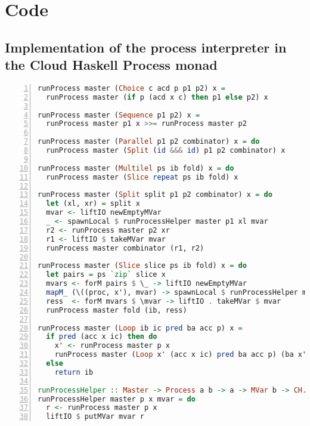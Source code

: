 \chapter{Code}

\clearpage

\section{Implementation of the process interpreter in the Cloud Haskell Process monad}
\label{app:distributed_split_slice}
\begin{lstlisting}[language=Haskell,frame=tb,numbers=left,caption=Implementation of \texttt{runProcess} in the \textsf{Cloud Haskell} \texttt{Process} monad.]
runProcess master (Choice c acd p p1 p2) x =
  runProcess master (if p (acd x c) then p1 else p2) x

runProcess master (Sequence p1 p2) x =
  runProcess master p1 x >>= runProcess master p2

runProcess master (Parallel p1 p2 combinator) x = do
  runProcess master (Split (id &&& id) p1 p2 combinator) x

runProcess master (Multilel ps ib fold) x = do
  runProcess master (Slice repeat ps ib fold) x

runProcess master (Split split p1 p2 combinator) x = do
  let (xl, xr) = split x
  mvar <- liftIO newEmptyMVar
  _ <- spawnLocal $ runProcessHelper master p1 xl mvar
  r2 <- runProcess master p2 xr
  r1 <- liftIO $ takeMVar mvar
  runProcess master combinator (r1, r2)

runProcess master (Slice slice ps ib fold) x = do
  let pairs = ps `zip` slice x
  mvars <- forM pairs $ \_ -> liftIO newEmptyMVar
  mapM_ (\((proc, x'), mvar) -> spawnLocal $ runProcessHelper master proc x' mvar) (pairs `zip` mvars)
  ress  <- forM mvars $ \mvar -> liftIO . takeMVar $ mvar
  runProcess master fold (ib, ress)

runProcess master (Loop ib ic pred ba acc p) x =
  if pred (acc x ic) then do
    x' <- runProcess master p x
    runProcess master (Loop x' (acc x ic) pred ba acc p) (ba x')
  else
    return ib

runProcessHelper :: Master -> Process a b -> a -> MVar b -> CH.Process ()
runProcessHelper master p x mvar = do
  r <- runProcess master p x
  liftIO $ putMVar mvar r
\end{lstlisting}

